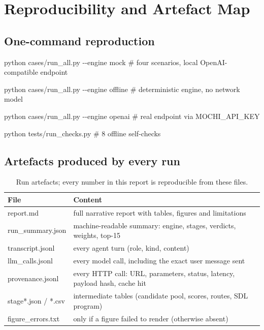 \chapter{Reproducibility and Artefact Map}

\section{One-command reproduction}

python cases/run\_all.py -{}-engine mock      \# four scenarios, local OpenAI-compatible endpoint

python cases/run\_all.py -{}-engine offline   \# deterministic engine, no network model

python cases/run\_all.py -{}-engine openai    \# real endpoint via MOCHI\_API\_KEY

python tests/run\_checks.py                 \# 8 offline self-checks

\section{Artefacts produced by every run}

\begin{table}[htbp]
\centering
\small
\caption{Run artefacts; every number in this report is reproducible from these files.}
\begin{tabularx}{\textwidth}{l>{\raggedright\arraybackslash}X}
\hline
File & Content \\
\hline
report.md & full narrative report with tables, figures and limitations \\
run\_summary.json & machine-readable summary: engine, stages, verdicts, weights, top-15 \\
transcript.jsonl & every agent turn (role, kind, content) \\
llm\_calls.jsonl & every model call, including the exact user message sent \\
provenance.jsonl & every HTTP call: URL, parameters, status, latency, payload hash, cache hit \\
stage*.json / *.csv & intermediate tables (candidate pool, scores, routes, SDL program) \\
figure\_errors.txt & only if a figure failed to render (otherwise absent) \\
\hline
\end{tabularx}

\end{table}

